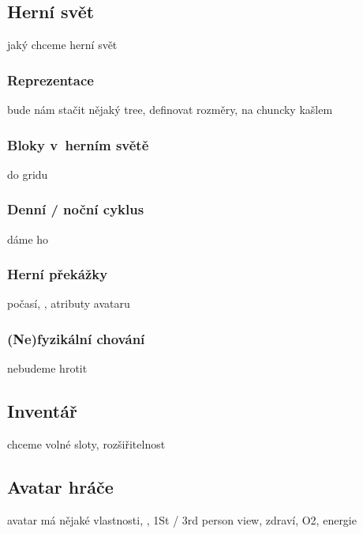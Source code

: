 \subsection{Herní svět}

jaký chceme herní svět

\subsubsection{Reprezentace}

bude nám stačit nějaký tree, definovat rozměry, na chuncky kašlem

\subsubsection{Bloky v~herním světě}

do gridu

\subsubsection{Denní / noční cyklus}
dáme ho

\subsubsection{Herní překážky}

počasí, , atributy avataru

\subsubsection{(Ne)fyzikální chování}

nebudeme hrotit

\subsection{Inventář}

chceme volné sloty, rozšiřitelnost

\subsection{Avatar hráče}
avatar má nějaké vlastnosti, \HUD{}, 1St / 3rd person view, zdraví, O2, energie



